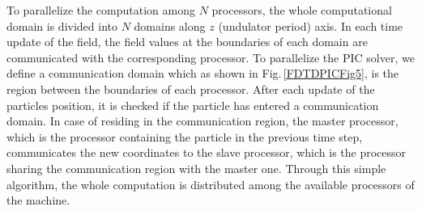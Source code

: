 To parallelize the computation among $N$ processors, the whole computational domain is divided into $N$ domains along $z$ (undulator period) axis.
%
In each time update of the field, the field values at the boundaries of each domain are communicated with the corresponding processor.
%
To parallelize the PIC solver, we define a communication domain which as shown in Fig.\,\ref{FDTDPICFig5}, is the region between the boundaries of each processor.
%
After each update of the particles position, it is checked if the particle has entered a communication domain.
%
In case of residing in the communication region, the master processor, which is the processor containing the particle in the previous time step, communicates the new coordinates to the slave processor, which is the processor sharing the communication region with the master one.
%
Through this simple algorithm, the whole computation is distributed among the available processors of the machine. 
